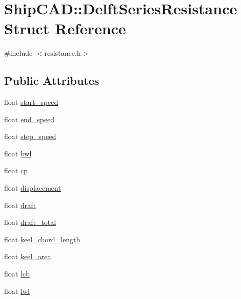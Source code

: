 \hypertarget{structShipCAD_1_1DelftSeriesResistance}{\section{Ship\-C\-A\-D\-:\-:Delft\-Series\-Resistance Struct Reference}
\label{structShipCAD_1_1DelftSeriesResistance}
}


{\ttfamily \#include $<$resistance.\-h$>$}

\subsection*{Public Attributes}
\begin{DoxyCompactItemize}
\item 
float \hyperlink{structShipCAD_1_1DelftSeriesResistance_a040e0d678c7dbc24c29b7da618b4094d}{start\-\_\-speed}
\item 
float \hyperlink{structShipCAD_1_1DelftSeriesResistance_abd1672b905c07093735775ff455e5a98}{end\-\_\-speed}
\item 
float \hyperlink{structShipCAD_1_1DelftSeriesResistance_a0e3ee6d984afd4ddf1cf483261904574}{step\-\_\-speed}
\item 
float \hyperlink{structShipCAD_1_1DelftSeriesResistance_a160c7b99be523bcda5301231806af6b3}{bwl}
\item 
float \hyperlink{structShipCAD_1_1DelftSeriesResistance_ae489114ad6f1d03758420f77b58de519}{cp}
\item 
float \hyperlink{structShipCAD_1_1DelftSeriesResistance_a1c98fdc7b3c1b28f6f8029af2e009992}{displacement}
\item 
float \hyperlink{structShipCAD_1_1DelftSeriesResistance_a208e360c5ca0d029f9f433a7bc2cade2}{draft}
\item 
float \hyperlink{structShipCAD_1_1DelftSeriesResistance_a4db81049e448c381019f97dc630d51af}{draft\-\_\-total}
\item 
float \hyperlink{structShipCAD_1_1DelftSeriesResistance_a986244b5c6944f01dbdae5d54b895c84}{keel\-\_\-chord\-\_\-length}
\item 
float \hyperlink{structShipCAD_1_1DelftSeriesResistance_ab1bf49519c2ed054b7699898d7f5aead}{keel\-\_\-area}
\item 
float \hyperlink{structShipCAD_1_1DelftSeriesResistance_aca93b2c11316e29b2f98a3bdcdf65bc5}{lcb}
\item 
float \hyperlink{structShipCAD_1_1DelftSeriesResistance_a7232b8ea3003087a4772a650319ec8f2}{lwl}

\end{DoxyCompactItemize}
